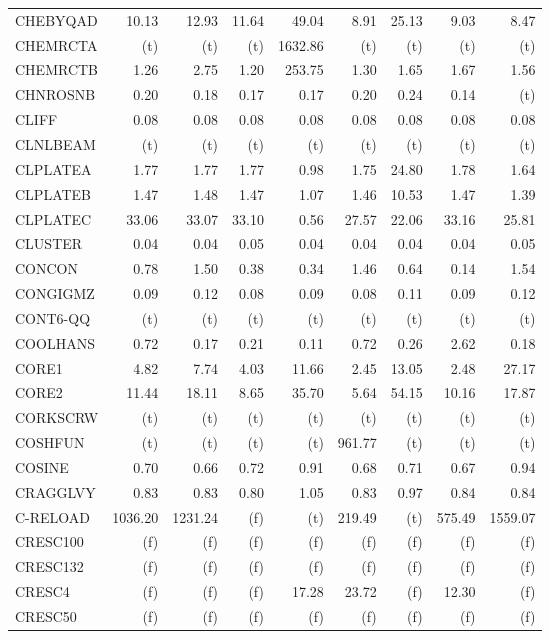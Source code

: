 \documentclass[11pt,twoside]{article}
\begin{document}
{\begin{longtable}[c]{|l|r|r|r|r|r|r|r|r|}
CHEBYQAD & 10.13 & 12.93 & 11.64 & 49.04 & 8.91 & 25.13 & 9.03 & 8.47 \\
CHEMRCTA & (t) & (t) & (t) & 1632.86 & (t) & (t) & (t) & (t) \\
CHEMRCTB & 1.26 & 2.75 & 1.20 & 253.75 & 1.30 & 1.65 & 1.67 & 1.56 \\
CHNROSNB & 0.20 & 0.18 & 0.17 & 0.17 & 0.20 & 0.24 & 0.14 & (t) \\
CLIFF & 0.08 & 0.08 & 0.08 & 0.08 & 0.08 & 0.08 & 0.08 & 0.08 \\
CLNLBEAM & (t) & (t) & (t) & (t) & (t) & (t) & (t) & (t) \\
CLPLATEA & 1.77 & 1.77 & 1.77 & 0.98 & 1.75 & 24.80 & 1.78 & 1.64 \\
CLPLATEB & 1.47 & 1.48 & 1.47 & 1.07 & 1.46 & 10.53 & 1.47 & 1.39 \\
CLPLATEC & 33.06 & 33.07 & 33.10 & 0.56 & 27.57 & 22.06 & 33.16 & 25.81 \\
CLUSTER & 0.04 & 0.04 & 0.05 & 0.04 & 0.04 & 0.04 & 0.04 & 0.05 \\
CONCON & 0.78 & 1.50 & 0.38 & 0.34 & 1.46 & 0.64 & 0.14 & 1.54 \\
CONGIGMZ & 0.09 & 0.12 & 0.08 & 0.09 & 0.08 & 0.11 & 0.09 & 0.12 \\
CONT6-QQ & (t) & (t) & (t) & (t) & (t) & (t) & (t) & (t) \\
COOLHANS & 0.72 & 0.17 & 0.21 & 0.11 & 0.72 & 0.26 & 2.62 & 0.18 \\
CORE1 & 4.82 & 7.74 & 4.03 & 11.66 & 2.45 & 13.05 & 2.48 & 27.17 \\
CORE2 & 11.44 & 18.11 & 8.65 & 35.70 & 5.64 & 54.15 & 10.16 & 17.87 \\
CORKSCRW & (t) & (t) & (t) & (t) & (t) & (t) & (t) & (t) \\
COSHFUN & (t) & (t) & (t) & (t) & 961.77 & (t) & (t) & (t) \\
COSINE & 0.70 & 0.66 & 0.72 & 0.91 & 0.68 & 0.71 & 0.67 & 0.94 \\
CRAGGLVY & 0.83 & 0.83 & 0.80 & 1.05 & 0.83 & 0.97 & 0.84 & 0.84 \\
C-RELOAD & 1036.20 & 1231.24 & (f) & (t) & 219.49 & (t) & 575.49 & 1559.07 \\
CRESC100 & (f) & (f) & (f) & (f) & (f) & (f) & (f) & (f) \\
CRESC132 & (f) & (f) & (f) & (f) & (f) & (f) & (f) & (f) \\
CRESC4 & (f) & (f) & (f) & 17.28 & 23.72 & (f) & 12.30 & (f) \\
CRESC50 & (f) & (f) & (f) & (f) & (f) & (f) & (f) & (f) \\

\end{longtable}}
\end{document}

